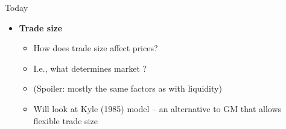 \documentclass[english,10pt
,aspectratio=169
]{beamer}
\begin{document}


\begin{frame}{Today}
	\begin{itemize}
		\item \textbf{Trade size}
		\begin{itemize}
			\item How does trade size affect prices? 
			\item I.e., what determines market ?
			\item (Spoiler: mostly the same factors as with liquidity)
			\item Will look at Kyle (1985) model -- an alternative to GM that allows flexible trade size
		\end{itemize}
	\end{itemize}
\end{frame}
\end{document}
